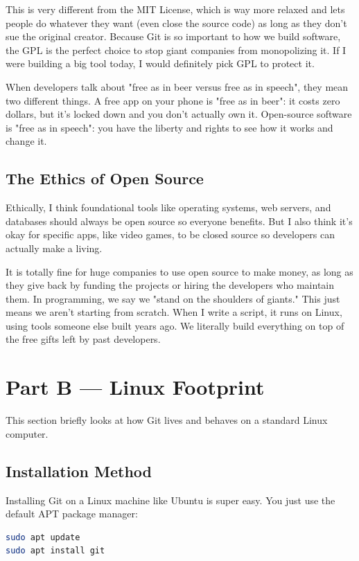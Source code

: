\documentclass[12pt,a4paper]{report}
\begin{document}
This is very different from the MIT License, which is way more relaxed and lets people do whatever they want (even close the source code) as long as they don't sue the original creator. Because Git is so important to how we build software, the GPL is the perfect choice to stop giant companies from monopolizing it. If I were building a big tool today, I would definitely pick GPL to protect it.

When developers talk about "free as in beer versus free as in speech", they mean two different things. A free app on your phone is "free as in beer": it costs zero dollars, but it's locked down and you don't actually own it. Open-source software is "free as in speech": you have the liberty and rights to see how it works and change it.

\subsection{The Ethics of Open Source}
Ethically, I think foundational tools like operating systems, web servers, and databases should always be open source so everyone benefits. But I also think it's okay for specific apps, like video games, to be closed source so developers can actually make a living. 

It is totally fine for huge companies to use open source to make money, as long as they give back by funding the projects or hiring the developers who maintain them. In programming, we say we "stand on the shoulders of giants." This just means we aren't starting from scratch. When I write a script, it runs on Linux, using tools someone else built years ago. We literally build everything on top of the free gifts left by past developers.

\section{Part B --- Linux Footprint}

This section briefly looks at how Git lives and behaves on a standard Linux computer.

\subsection{Installation Method}
Installing Git on a Linux machine like Ubuntu is super easy. You just use the default APT package manager:
\begin{lstlisting}[language=bash]
sudo apt update
sudo apt install git
\end{lstlisting}
\end{document}

